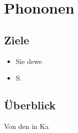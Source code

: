 
\chapter{Phononen}





\section{Ziele}

\begin{itemize}
\item Sie dewe

\item S.

\end{itemize}





\section{Überblick}

Von den in Ka





\printbibliography[segment=\therefsegment,heading=subbibliography]
